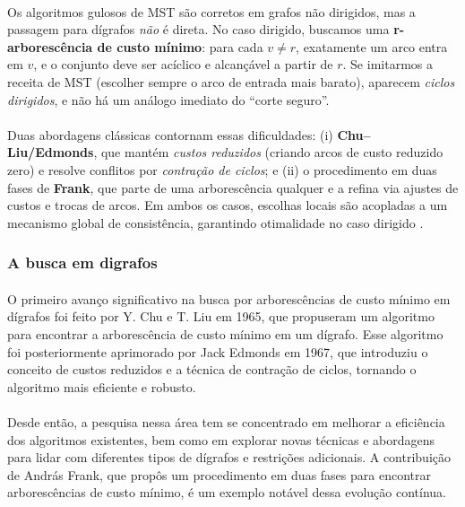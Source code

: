 \documentclass[12pt,a4paper]{article}
\begin{document}
\paragraph{}
Os algoritmos gulosos de MST são corretos em grafos não dirigidos, mas a passagem para dígrafos \emph{não} é direta. No caso dirigido, buscamos uma \textbf{r-arborescência de custo mínimo}: para cada \(v\neq r\), exatamente um arco entra em \(v\), e o conjunto deve ser acíclico e alcançável a partir de \(r\). Se imitarmos a receita de MST (escolher sempre o arco de entrada mais barato), aparecem \emph{ciclos dirigidos}, e não há um análogo imediato do “corte seguro”.

\paragraph{}
Duas abordagens clássicas contornam essas dificuldades: (i) \textbf{Chu–Liu/Edmonds}, que mantém \emph{custos reduzidos} (criando arcos de custo reduzido zero) e resolve conflitos por \emph{contração de ciclos}; e (ii) o procedimento em duas fases de \textbf{Frank}, que parte de uma arborescência qualquer e a refina via ajustes de custos e trocas de arcos. Em ambos os casos, escolhas locais são acopladas a um mecanismo global de consistência, garantindo otimalidade no caso dirigido \cite{schrijver2003comb}.

\subsubsection{A busca em digrafos}

\paragraph{}
O primeiro avanço significativo na busca por arborescências de custo mínimo em dígrafos foi feito por Y. Chu e T. Liu em 1965, que propuseram um algoritmo para encontrar a arborescência de custo mínimo em um dígrafo. Esse algoritmo foi posteriormente aprimorado por Jack Edmonds em 1967, que introduziu o conceito de custos reduzidos e a técnica de contração de ciclos, tornando o algoritmo mais eficiente e robusto.

\paragraph{}
Desde então, a pesquisa nessa área tem se concentrado em melhorar a eficiência dos algoritmos existentes, bem como em explorar novas técnicas e abordagens para lidar com diferentes tipos de dígrafos e restrições adicionais. A contribuição de András Frank, que propôs um procedimento em duas fases para encontrar arborescências de custo mínimo, é um exemplo notável dessa evolução contínua.
\end{document}
